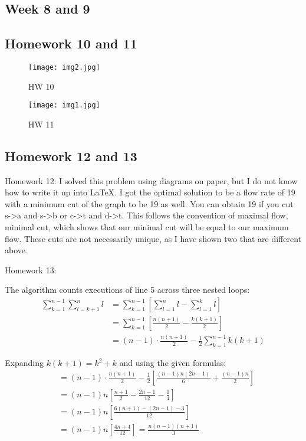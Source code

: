 \documentclass{article}
\theoremstyle{theorem}
\theoremstyle{definition}
\theoremstyle{remark}
\begin{document}
\subsection{Week 8 and 9}

\subsection{Homework 10 and 11}

\begin{figure}[h]
    \centerline{\texttt{[image: img2.jpg]}}
    \caption{HW 10}
\end{figure}

\begin{figure}[h]
    \centerline{\texttt{[image: img1.jpg]}}
    \caption{HW 11}
\end{figure}




\subsection{Homework 12 and 13}
Homework 12:
I solved this problem using diagrams on paper, but I do not know how to write it up into LaTeX. I got the optimal solution to be a flow rate of 19 with a minimum cut of the graph to be 19 as well. You can obtain 19 if you cut s->a and s->b or c->t and d->t. This follows the convention of maximal flow, minimal cut, which shows that our minimal cut will be equal to our maximum flow. These cuts are not necessarily unique, as I have shown two that are different above.

Homework 13:

The algorithm counts executions of line 5 across three nested loops:
\begin{align}
\sum_{k=1}^{n-1} \sum_{l=k+1}^{n} l &= \sum_{k=1}^{n-1} \left[\sum_{l=1}^{n} l - \sum_{l=1}^{k} l\right] \\
&= \sum_{k=1}^{n-1} \left[\frac{n(n+1)}{2} - \frac{k(k+1)}{2}\right] \\
&= (n-1) \cdot \frac{n(n+1)}{2} - \frac{1}{2}\sum_{k=1}^{n-1} k(k+1)
\end{align}

Expanding $k(k+1) = k^2 + k$ and using the given formulas:
\begin{align}
&= (n-1) \cdot \frac{n(n+1)}{2} - \frac{1}{2}\left[\frac{(n-1)n(2n-1)}{6} + \frac{(n-1)n}{2}\right] \\
&= (n-1)n\left[\frac{n+1}{2} - \frac{2n-1}{12} - \frac{1}{4}\right] \\
&= (n-1)n\left[\frac{6(n+1) - (2n-1) - 3}{12}\right] \\
&= (n-1)n\left[\frac{4n + 4}{12}\right] = \frac{n(n-1)(n+1)}{3}
\end{align}
\end{document}
